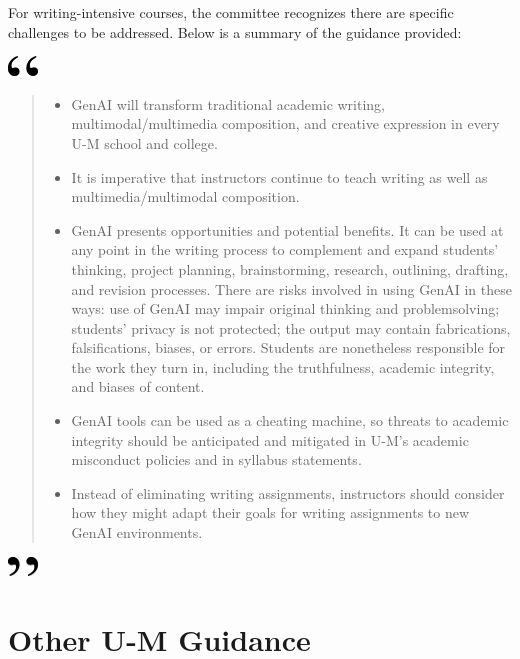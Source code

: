 \documentclass[
]{book}
\begin{document}
For writing-intensive courses, the committee recognizes there are specific challenges to be addressed. Below is a summary of the guidance provided:

\includegraphics[width=0.3125in,height=0.20833in]{open.png}

\begin{quote}
\begin{itemize}
\item
  GenAI will transform traditional academic writing, multimodal/multimedia composition, and creative expression in every U-M school and college.
\item
  It is imperative that instructors continue to teach writing as well as multimedia/multimodal composition.
\item
  GenAI presents opportunities and potential benefits. It can be used at any point in the writing process to complement and expand students' thinking, project planning, brainstorming, research, outlining, drafting, and revision processes. There are risks involved in using GenAI in these ways: use of GenAI may impair original thinking and problemsolving; students' privacy is not protected; the output may contain fabrications, falsifications, biases, or errors. Students are nonetheless responsible for the work they turn in, including the truthfulness, academic integrity, and biases of content.
\item
  GenAI tools can be used as a cheating machine, so threats to academic integrity should be anticipated and mitigated in U-M's academic misconduct policies and in syllabus statements.
\item
  Instead of eliminating writing assignments, instructors should consider how they might adapt their goals for writing assignments to new GenAI environments.
\end{itemize}
\end{quote}

\includegraphics[width=0.3125in,height=0.20833in]{close.png}

\hypertarget{other-u-m-guidance}{%
\section{Other U-M Guidance}\label{other-u-m-guidance}}
\end{document}
